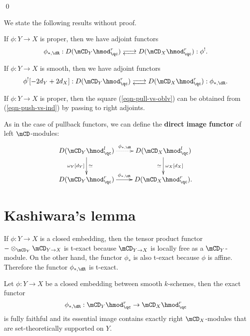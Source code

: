 	\qed

	We state the following results without proof.

	\begin{prop}
		If $\phi:Y \to X$ is proper, then we have adjoint functors
		\[
			\phi_{*,\dR}: D( \mCD_Y\hmod_\qc^r ) \adj  D( \mCD_X\hmod_\qc^r ): \phi^!.
		\]
	\end{prop}

	\begin{prop}
		If $\phi:Y \to X$ is smooth, then we have adjoint functors
		\[
			\phi^![-2 d_Y+2d_X]: D( \mCD_Y\hmod_\qc^r ) \adj  D( \mCD_X\hmod_\qc^r ): \phi_{*,\dR}.
		\]
	\end{prop}

	\begin{rem}
		If $\phi:Y \to X$ is proper, then the square (\ref{eqn-pull-vs-oblv}) can be obtained from (\ref{eqn-push-vs-ind}) by passing to right adjoints.
	\end{rem}

	

	\begin{constr}
		As in the case of pullback functors, we can define the \textbf{direct image functor} of left $\mCD$-modules:
		\[
			\xymatrix{
				D(\mCD_Y\hmod^l_\qc) \ar@{.>}[r]^-{\phi_{*,\dR}} \ar[d]_-{\omega_Y[d_Y]}^-\simeq &
				D(\mCD_X\hmod^l_\qc) \ar[d]^-{\omega_X[d_X]}_-\simeq \\
				D(\mCD_Y\hmod^r_\qc) \ar[r]^-{\phi_{*,\dR}} &
				D(\mCD_X\hmod^r_\qc).
			}
		\]
	\end{constr}



\section{Kashiwara's lemma}

	If $\phi:Y\to X$ is a closed embedding, then the tensor product functor $-\ot_{\mCD_Y} \mCD_{Y\to X}$ is t-exact because $\mCD_{Y\to X}$ is locally free as a $\mCD_Y$-module. On the other hand, the functor $\phi_*$ is also t-exact because $\phi$ is affine. Therefore the functor $\phi_{*,\dR} $ is t-exact. 

	\begin{thm}
		Let $\phi:Y \to X$ be a closed embedding between smooth $k$-schemes, then the exact functor
		\[
			\phi_{*,\dR}:  \mCD_Y\hmod_\qc^r  \to  \mCD_X\hmod_\qc^r
		\]
		is fully faithful and its essential image contains exactly right $\mCD_X$-modules that are set-theoretically supported on $Y$.
	\end{thm}



